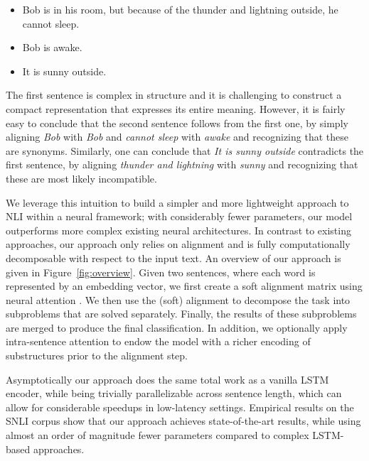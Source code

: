 \documentclass[11pt,letterpaper]{article}
\begin{document}
\begin{itemize}
\vspace{-0.05cm}
\it
\setlength\itemsep{-0.05em}
\item Bob is in his room, but because of the thunder and lightning outside, he cannot sleep.
\item Bob is awake.
\item It is sunny outside.
\vspace{-0.05cm}
\end{itemize}


The first sentence is complex in structure and it is challenging to construct a compact representation that expresses its entire meaning.
However, it is fairly easy to conclude that the second sentence follows from the first one, by simply aligning \textit{Bob} with \textit{Bob} and \textit{cannot sleep} with \textit{awake} and recognizing that these are synonyms.
Similarly, one can conclude that \textit{It is sunny outside} contradicts the first sentence, by aligning \textit{thunder and lightning} with \textit{sunny} and recognizing that these are most likely incompatible.

We leverage this intuition to build a simpler and more lightweight approach to NLI within a neural framework; with considerably fewer parameters, our model outperforms more complex existing neural architectures.
In contrast to existing approaches, our approach only relies on alignment and is fully computationally decomposable with respect to the input text.
An overview of our approach is given in Figure~\ref{fig:overview}.
Given two sentences, where each word is represented by an embedding vector, we first create a soft alignment matrix using neural attention \cite{bahdanau2014neural}.
We then use the (soft) alignment to decompose the task into subproblems that are solved separately.
Finally, the results of these subproblems are merged to produce the final classification.
In addition, we optionally apply intra-sentence attention \cite{cheng2016long} to endow the model with a richer encoding of substructures prior to the alignment step.

Asymptotically our approach does the same total work as a vanilla LSTM encoder, while being trivially parallelizable across sentence length, which can allow for considerable speedups in low-latency settings.
Empirical results on the SNLI corpus show that our approach achieves state-of-the-art results, while using almost an order of magnitude fewer parameters compared to complex LSTM-based approaches.
\end{document}
